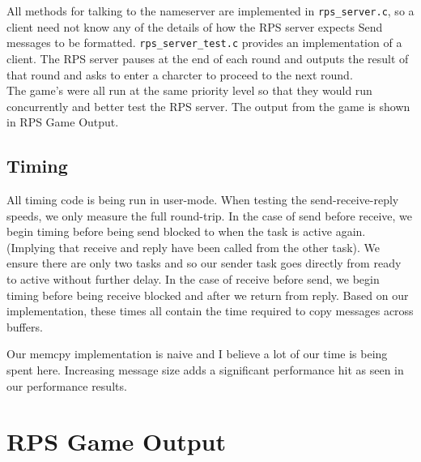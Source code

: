 \documentclass[letterpaper]{article}
\begin{document}
All methods for talking to the nameserver are implemented in {\tt rps\_server.c}, so a client need not know any of the details of how the RPS server expects Send messages to be formatted. {\tt rps\_server\_test.c} provides an implementation of a client. The RPS server pauses at the end of each round and outputs the result of that round and asks to enter a charcter to proceed to the next round. \\

The game's were all run at the same priority level so that they would run concurrently and better test the RPS server. The output from the game is shown in RPS Game Output.

\subsection{Timing}

All timing code is being run in user-mode. When testing the send-receive-reply speeds, we only measure the full round-trip. In the case of send before receive, we begin timing before being send blocked to when the task is active again. (Implying that receive and reply have been called from the other task). We ensure there are only two tasks and so our sender task goes directly from ready to active without further delay. In the case of receive before send, we begin timing before being receive blocked and after we return from reply. Based on our implementation, these times all contain the time required to copy messages across buffers.

Our memcpy implementation is naive and I believe a lot of our time is being spent here. Increasing message size adds a significant performance hit as seen in our performance results.

\section{RPS Game Output}
\end{document}

